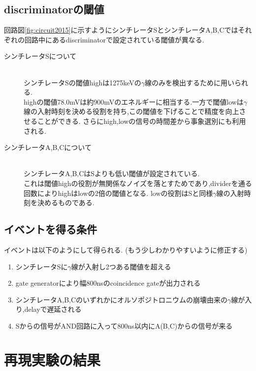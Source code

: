 \subsection{discriminatorの閾値}
回路図\ref{fig:circuit2015}に示すようにシンチレータSとシンチレータA,B,Cではそれぞれの回路中にあるdiscriminatorで設定されている閾値が異なる.
\begin{description}
	\item[シンチレータSについて]\mbox{}\\
		シンチレータSの閾値highは1275keVの$\gamma$線のみを検出するために用いられる.\\
		highの閾値78.0mVは約900mVのエネルギーに相当する.一方で閾値lowは$\gamma$線の入射時刻を決める役割を持ち,この閾値を下げることで精度を向上させることができる.
		さらにhigh,lowの信号の時間差から事象選別にも利用される.
	\item[シンチレータA,B,Cについて]\mbox{}\\
		シンチレータA,B,CはSよりも低い閾値が設定されている.\\
		これは閾値highの役割が無関係なノイズを落とすためであり,dividerを通る回数によりhighはlowの2倍の閾値となる.
		lowの役割はSと同様$\gamma$線の入射時刻を決めるものである.
\end{description}

\subsection{イベントを得る条件}
イベントは以下のようにして得られる.
(もう少しわかりやすいように修正する)
\begin{enumerate}
	\item シンチレータSに$\gamma$線が入射し2つある閾値を超える
	\item gate generatorにより幅800nsのcoincidence gateが出力される
	\item シンチレータA,B,Cのいずれかにオルソポジトロニウムの崩壊由来の$\gamma$線が入り,delayで遅延される
	\item Sからの信号がAND回路に入って800ns以内にA(B,C)からの信号が来る
\end{enumerate}

\section{再現実験の結果}

